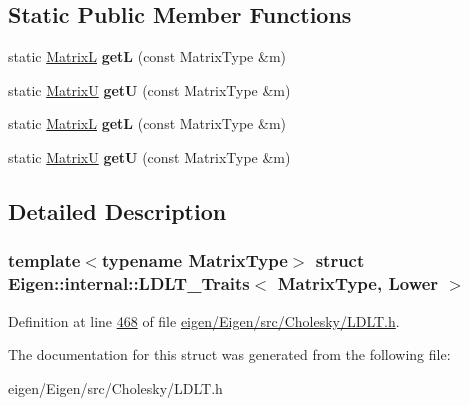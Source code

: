 \subsection*{Static Public Member Functions}
\begin{DoxyCompactItemize}
\item 
\mbox{\label{struct_eigen_1_1internal_1_1_l_d_l_t___traits_3_01_matrix_type_00_01_lower_01_4_a0bdfb73fe29737fed4e281100a3bf565}} 
static \hyperlink{group___core___module_class_eigen_1_1_triangular_view}{MatrixL} {\bfseries getL} (const Matrix\+Type \&m)
\item 
\mbox{\label{struct_eigen_1_1internal_1_1_l_d_l_t___traits_3_01_matrix_type_00_01_lower_01_4_a71b18cd5918d44a3022f4a6cb5b9da0a}} 
static \hyperlink{group___core___module_class_eigen_1_1_triangular_view}{MatrixU} {\bfseries getU} (const Matrix\+Type \&m)
\item 
\mbox{\label{struct_eigen_1_1internal_1_1_l_d_l_t___traits_3_01_matrix_type_00_01_lower_01_4_a0bdfb73fe29737fed4e281100a3bf565}} 
static \hyperlink{group___core___module_class_eigen_1_1_triangular_view}{MatrixL} {\bfseries getL} (const Matrix\+Type \&m)
\item 
\mbox{\label{struct_eigen_1_1internal_1_1_l_d_l_t___traits_3_01_matrix_type_00_01_lower_01_4_a71b18cd5918d44a3022f4a6cb5b9da0a}} 
static \hyperlink{group___core___module_class_eigen_1_1_triangular_view}{MatrixU} {\bfseries getU} (const Matrix\+Type \&m)
\end{DoxyCompactItemize}


\subsection{Detailed Description}
\subsubsection*{template$<$typename Matrix\+Type$>$\newline
struct Eigen\+::internal\+::\+L\+D\+L\+T\+\_\+\+Traits$<$ Matrix\+Type, Lower $>$}



Definition at line \hyperlink{eigen_2_eigen_2src_2_cholesky_2_l_d_l_t_8h_source_l00468}{468} of file \hyperlink{eigen_2_eigen_2src_2_cholesky_2_l_d_l_t_8h_source}{eigen/\+Eigen/src/\+Cholesky/\+L\+D\+L\+T.\+h}.



The documentation for this struct was generated from the following file\+:\begin{DoxyCompactItemize}
\item 
eigen/\+Eigen/src/\+Cholesky/\+L\+D\+L\+T.\+h\end{DoxyCompactItemize}
